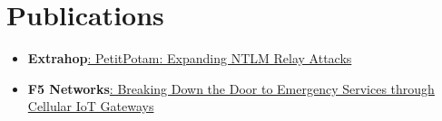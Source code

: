 \documentclass[letterpaper,11pt]{article}
\newcommand{\resumeSubHeadingListStart}{\begin{itemize}[leftmargin=*]}
\newcommand{\resumeSubHeadingListEnd}{\end{itemize}}
\begin{document}
\section{Publications}
  \resumeSubHeadingListStart
    \item{
      \textbf{Extrahop}{\href{https://www.extrahop.com/company/blog/2021/petitpotam-and-ntlm-relay-attacks/}{: PetitPotam: Expanding NTLM Relay Attacks} }
    }
    \item{
      \textbf{F5 Networks}{\href{https://www.f5.com/labs/articles/threat-intelligence/breaking-down-the-door-to-emergency-services-through-cellular-io}{: Breaking Down the Door to Emergency Services through Cellular IoT Gateways} }
    }
  \resumeSubHeadingListEnd
\end{document}
